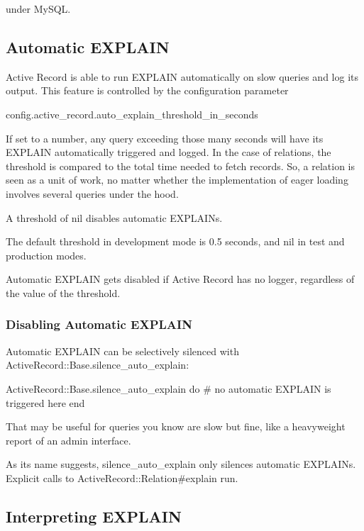 \documentclass[10pt]{book}
\newenvironment{code}{%
  \scriptsize
    \verbatim
}{%
    \endverbatim
    \newline
}
\begin{document}
under MySQL.

\subsection{ Automatic EXPLAIN}

Active Record is able to run EXPLAIN automatically on slow queries and log its output. This feature is controlled by the configuration parameter
\begin{code}
config.active_record.auto_explain_threshold_in_seconds
\end{code}

If set to a number, any query exceeding those many seconds will have its EXPLAIN automatically triggered and logged. In the case of relations, the threshold is compared to the total time needed to fetch records. So, a relation is seen as a unit of work, no matter whether the implementation of eager loading involves several queries under the hood.

A threshold of nil disables automatic EXPLAINs.

The default threshold in development mode is 0.5 seconds, and nil in test and production modes.

Automatic EXPLAIN gets disabled if Active Record has no logger, regardless of the value of the threshold.

\subsubsection{ Disabling Automatic EXPLAIN}

Automatic EXPLAIN can be selectively silenced with ActiveRecord::Base.silence\_auto\_explain:
\begin{code}
ActiveRecord::Base.silence_auto_explain do
  # no automatic EXPLAIN is triggered here
end
\end{code}

That may be useful for queries you know are slow but fine, like a heavyweight report of an admin interface.

As its name suggests, silence\_auto\_explain only silences automatic EXPLAINs. Explicit calls to ActiveRecord::Relation\#explain run.

\subsection{ Interpreting EXPLAIN}
\end{document}
